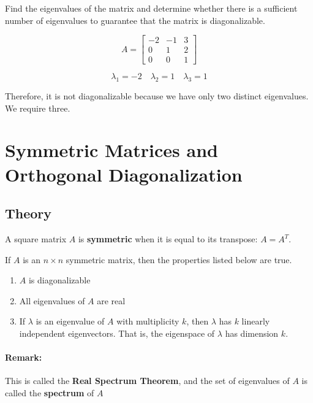\documentclass{report}
\begin{document}
\begin{tcolorbox}[colframe = lightred]
	Find the eigenvalues of the matrix and determine whether there is a sufficient number of eigenvalues to guarantee that the matrix is diagonalizable.
	
	$$
	A = \begin{bmatrix} -2 & -1 & 3 \\ 0 & 1 & 2 \\ 0 & 0 & 1 \end{bmatrix} 
	$$
\end{tcolorbox}

$$
\lambda_1 = -2 \quad \lambda_2 = 1 \quad \lambda_3 = 1 
$$

\noindent Therefore, it is not diagonalizable because we have only two distinct eigenvalues. We require three. 

\section{Symmetric Matrices and Orthogonal Diagonalization}

\subsection{Theory}

\begin{tcolorbox}[title = Definition of a Symmetric Matrix]
	A square matrix $A$ is \textbf{symmetric} when it is equal to its transpose: $A = A^T$.
\end{tcolorbox}

\begin{tcolorbox}[title = Properties of Symmetric Matrices]
	If $A$ is an $n \times n$ symmetric matrix, then the properties listed below are true.
	
	\begin{enumerate}
		\item $A$ is diagonalizable
		\item All eigenvalues of $A$ are real
		\item If $\lambda$ is an eigenvalue of $A$ with multiplicity $k$, then $\lambda$ has $k$ linearly independent eigenvectors. That is, the eigenspace of $\lambda$ has dimension $k$.
	\end{enumerate}
	
	\paragraph{Remark:} This is called the \textbf{Real Spectrum Theorem}, and the set of eigenvalues of $A$ is called the \textbf{spectrum} of $A$
\end{tcolorbox}
\end{document}
